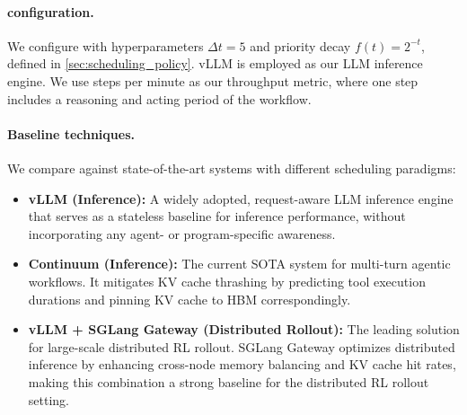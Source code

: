 \paragraph{\ouralg configuration.} We configure \ouralg with hyperparameters $\Delta t = 5$ and priority decay $f(t) = 2^{-t}$, defined in \autoref{sec:scheduling_policy}. vLLM is employed as our LLM inference engine. We use steps per minute as our throughput metric, where one step includes a reasoning and acting period of the workflow.
\vspace{-2mm}
\paragraph{Baseline techniques.}
We compare against state-of-the-art systems with different scheduling paradigms:


\begin{itemize}[itemsep=0.0pt,topsep=0pt,leftmargin=*]
    \item \textbf{vLLM (Inference):} A widely adopted, request-aware LLM inference engine that serves as a stateless baseline for inference performance, without incorporating any agent- or program-specific awareness.
    \item \textbf{Continuum (Inference):} The current SOTA system for multi-turn agentic workflows. It mitigates KV cache thrashing by predicting tool execution durations and pinning KV cache to HBM correspondingly.
    \item \textbf{vLLM + SGLang Gateway (Distributed Rollout):} The leading solution for large-scale distributed RL rollout. SGLang Gateway optimizes distributed inference by enhancing cross-node memory balancing and KV cache hit rates, making this combination a strong baseline for the distributed RL rollout setting.
\end{itemize}
\vspace{-2mm}
